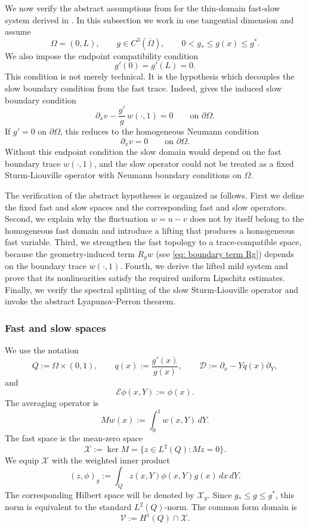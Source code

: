 \documentclass[11pt]{article}
\theoremstyle{definition}
\theoremstyle{remark}
\numberwithin{equation}{section}
\begin{document}
We now verify the abstract assumptions from  for the thin-domain
fast-slow system derived in . In this subsection we work in one
tangential dimension and assume
\[
\Omega=(0,L),\qquad
g\in C^3(\overline\Omega),\qquad
0<g_*\le g(x)\le g^* .
\]
We also impose the endpoint compatibility condition
\[
g'(0)=g'(L)=0.
\]
This condition is not merely technical. It is the hypothesis which decouples
the slow boundary condition from the fast trace. Indeed,  gives the
induced slow boundary condition
\[
\partial_xv-\frac{g'}g\,w(\cdot,1)=0
\qquad\text{on }\partial\Omega .
\]
If \(g'=0\) on \(\partial\Omega\), this reduces to the homogeneous Neumann
condition
\[
\partial_xv=0
\qquad\text{on }\partial\Omega.
\]
Without this endpoint condition the slow domain would depend on the fast
boundary trace \(w(\cdot,1)\), and the slow operator could not be treated as a
fixed Sturm-Liouville operator with Neumann boundary conditions on \(\Omega\).

The verification of the abstract hypotheses is organized as follows.
First we define the fixed fast and slow spaces and the corresponding fast and slow operators. 
Second, we explain why the fluctuation \(w=u-v\) does not by itself belong to the homogeneous fast domain and introduce a lifting that produces a homogeneous fast variable. 
Third, we strengthen the fast topology to a trace-compatible space, because the geometry-induced term \(R_gw\) (see \eqref{eq: boundary term Rg}) depends on the boundary trace \(w(\cdot,1)\).
Fourth, we derive the lifted mild system and prove that its nonlinearities satisfy the required uniform Lipschitz estimates.
Finally, we verify the spectral splitting of the slow Sturm-Liouville operator and invoke the abstract Lyapunov-Perron theorem.

\subsubsection*{Fast and slow spaces}
\label{subsubsec:thin-domain-fast-slow-spaces}

We use the notation
\[
Q:=\Omega\times(0,1),
\qquad
q(x):=\frac{g'(x)}{g(x)},
\qquad
\mathcal D:=\partial_x-Yq(x)\partial_Y,
\]
and
\[
\mathcal E\phi(x,Y):=\phi(x).
\]
The averaging operator is
\[
Mw(x):=\int_0^1 w(x,Y)\,dY.
\]
The fast space is the mean-zero space
\[
\mathcal X:=\ker M
=
\{z\in L^2(Q):Mz=0\}.
\]
We equip \(\mathcal X\) with the weighted inner product
\[
(z,\phi)_g
:=
\int_Q z(x,Y)\phi(x,Y)g(x)\,dx\,dY.
\]
The corresponding Hilbert space will be denoted by \(\mathcal X_g\). Since
\(g_*\le g\le g^*\), this norm is equivalent to the standard \(L^2(Q)\)-norm.
The common form domain is
\[
\mathcal V:=H^1(Q)\cap \mathcal X.
\]
\end{document}
